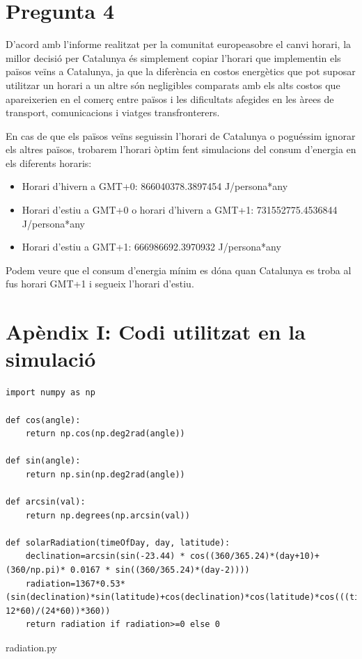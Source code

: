 \documentclass{article}
\begin{document}
\section*{Pregunta 4}

D'acord amb l'informe realitzat per la comunitat europea\footnotemark[\ref{eu-consultation}] sobre el canvi horari, la millor decisió per Catalunya és simplement copiar l'horari que implementin els països veïns a Catalunya, ja que la diferència en costos energètics que pot suposar utilitzar un horari a un altre són negligibles comparats amb els alts costos que apareixerien en el comerç entre països i les dificultats afegides en les àrees de transport, comunicacions i viatges transfronterers.

En cas de que els països veïns seguissin l'horari de Catalunya o poguéssim ignorar els altres països, trobarem l'horari òptim fent simulacions del consum d'energia en els diferents horaris:
\begin{itemize}
    \item Horari d'hivern a GMT+0: 866040378.3897454 J/persona*any
    \item Horari d'estiu a GMT+0 o horari d'hivern a GMT+1: 731552775.4536844 J/persona*any
    \item Horari d'estiu a GMT+1: 666986692.3970932 J/persona*any
\end{itemize}

Podem veure que el consum d'energia mínim es dóna quan Catalunya es troba al fus horari GMT+1 i segueix l'horari d'estiu.


\section*{Apèndix I: Codi utilitzat en la simulació}

\begin{lstlisting}[style=JavaStyle]
import numpy as np

def cos(angle):
    return np.cos(np.deg2rad(angle))

def sin(angle):
    return np.sin(np.deg2rad(angle))

def arcsin(val):
    return np.degrees(np.arcsin(val))

def solarRadiation(timeOfDay, day, latitude):
    declination=arcsin(sin(-23.44) * cos((360/365.24)*(day+10)+(360/np.pi)* 0.0167 * sin((360/365.24)*(day-2))))
    radiation=1367*0.53*(sin(declination)*sin(latitude)+cos(declination)*cos(latitude)*cos(((timeOfDay-12*60)/(24*60))*360))
    return radiation if radiation>=0 else 0
\end{lstlisting}
radiation.py
\end{document}
